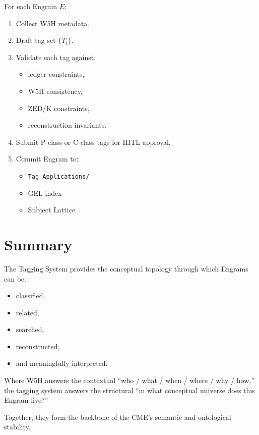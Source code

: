 For each Engram $E$:
\begin{enumerate}
    \item Collect W5H metadata.
    \item Draft tag set $\{T_i\}$.
    \item Validate each tag against:
    \begin{itemize}
        \item ledger constraints,
        \item W5H consistency,
        \item ZED/K constraints,
        \item reconstruction invariants.
    \end{itemize}
    \item Submit P-class or C-class tags for HITL approval.
    \item Commit Engram to:
    \begin{itemize}
        \item \texttt{Tag\_Applications/}
        \item GEL index
        \item Subject Lattice
    \end{itemize}
\end{enumerate}

\section{Summary}

The Tagging System provides the conceptual topology through which Engrams can be:
\begin{itemize}
    \item classified,
    \item related,
    \item searched,
    \item reconstructed,
    \item and meaningfully interpreted.
\end{itemize}

Where W5H answers the contextual ``who / what / when / where / why / how,''  
the tagging system answers the structural ``in what conceptual universe does this Engram live?''

Together, they form the backbone of the CME's semantic and ontological stability.
